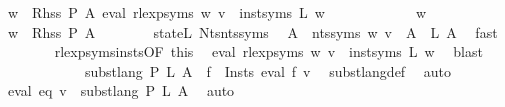\begin{isabellebody}
\ {\isachardoublequoteopen}{\isasymforall}w\ {\isasymin}\ Rhss\ P\ A{\isachardot}{\kern0pt}\ eval\ {\isacharparenleft}{\kern0pt}rlexp{\isacharunderscore}{\kern0pt}syms\ w{\isacharparenright}{\kern0pt}\ v\ {\isacharequal}{\kern0pt}\ inst{\isacharunderscore}{\kern0pt}syms\ L\ w{\isachardoublequoteclose}\isanewline
\ \ \ \ \isamarkupfalse%
\isanewline
\ \ \ \ \ \ \isamarkupfalse%
\ w\isanewline
\ \ \ \ \ \ \isamarkupfalse%
\ {\isachardoublequoteopen}w\ {\isasymin}\ Rhss\ P\ A{\isachardoublequoteclose}\isanewline
\ \ \ \ \ \ \isamarkupfalse%
\ state{\isacharunderscore}{\kern0pt}L\ Nts{\isacharunderscore}{\kern0pt}nts{\isacharunderscore}{\kern0pt}syms\ \isamarkupfalse%
\ {\isachardoublequoteopen}{\isasymforall}A\ {\isasymin}\ nts{\isacharunderscore}{\kern0pt}syms\ w{\isachardot}{\kern0pt}\ v\ {\isacharparenleft}{\kern0pt}{\isasymgamma}{\isacharprime}{\kern0pt}\ A{\isacharparenright}{\kern0pt}\ {\isacharequal}{\kern0pt}\ L\ A{\isachardoublequoteclose}\ \isamarkupfalse%
\ fast\isanewline
\ \ \ \ \ \ \isamarkupfalse%
\ rlexp{\isacharunderscore}{\kern0pt}syms{\isacharunderscore}{\kern0pt}insts{\isacharbrackleft}{\kern0pt}OF\ this{\isacharbrackright}{\kern0pt}\ \isamarkupfalse%
\ {\isachardoublequoteopen}eval\ {\isacharparenleft}{\kern0pt}rlexp{\isacharunderscore}{\kern0pt}syms\ w{\isacharparenright}{\kern0pt}\ v\ {\isacharequal}{\kern0pt}\ inst{\isacharunderscore}{\kern0pt}syms\ L\ w{\isachardoublequoteclose}\ \isamarkupfalse%
\ blast\isanewline
\ \ \ \ \isamarkupfalse%
\isanewline
\ \ \ \ \isamarkupfalse%
\ \isamarkupfalse%
\ {\isachardoublequoteopen}subst{\isacharunderscore}{\kern0pt}lang\ P\ L\ A\ {\isacharequal}{\kern0pt}\ {\isacharparenleft}{\kern0pt}{\isasymUnion}f\ {\isasymin}\ {\isacharquery}{\kern0pt}Insts{\isachardot}{\kern0pt}\ eval\ f\ v{\isacharparenright}{\kern0pt}{\isachardoublequoteclose}\ \isamarkupfalse%
\ subst{\isacharunderscore}{\kern0pt}lang{\isacharunderscore}{\kern0pt}def\ \isamarkupfalse%
\ auto\isanewline
\ \ \ \ \isamarkupfalse%
\ {\isacharasterisk}{\kern0pt}\ \isamarkupfalse%
\ {\isachardoublequoteopen}eval\ eq\ v\ {\isacharequal}{\kern0pt}\ subst{\isacharunderscore}{\kern0pt}lang\ P\ L\ A{\isachardoublequoteclose}\ \isamarkupfalse%
\ auto\isanewline
\ \ \isamarkupfalse%
\isanewline

\end{isabellebody}
